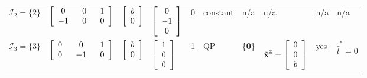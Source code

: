 \documentclass{imaman}
\newcommand{\bfx}{{\bf x}}
\newcommand{\bfzero}{{\bf 0}}
\newcommand{\calI}{{\mathcal I}}
\numberwithin{equation}{section}
\begin{document}
\begin{landscape}
\begin{table}[htbp]
\begin{threeparttable}[htbp]
\begin{tabular}{l l l l l l l l l l}
$\calI_2=\{2\}$ & \hspace{-0.1cm}$\left[ \renewcommand{\arraystretch}{1} \begin{array}{ccc} 0 & ~~0~~ & 1 \\ -1 & ~~0~~ & 0 \end{array}\right]$ & \hspace{-0.3cm}$\left[ \renewcommand{\arraystretch}{1} \begin{array}{c} b\\ 0\end{array}\right]$ & \hspace{-0.2cm}$\left[ \renewcommand{\arraystretch}{1} \begin{array}{c} 0 \\ {-1} \\ 0 \end{array}\right]$ & \hspace{-0.2cm}0 & \hspace{-0.1cm}constant\tnote{a} & \hspace{-0.1cm}n/a & \hspace{-0.1cm}n/a & \hspace{-0.1cm}n/a\tnote{b} & \hspace{-0.1cm}n/a \vspace{0.1cm} \vspace{0.1cm} \\
$\calI_3=\{3\}$ & \hspace{-0.1cm}$\left[ \renewcommand{\arraystretch}{1} \begin{array}{ccc} 0 & ~~0~~ & 1 \\ 0 & ~~{-1}~~ & 0 \end{array}\right]$ & \hspace{-0.3cm}$\left[ \renewcommand{\arraystretch}{1} \begin{array}{c} b\\ 0\end{array}\right]$ & \hspace{-0.2cm}$\left[ \renewcommand{\arraystretch}{1} \begin{array}{c} 1 \\ 0 \\ 0 \end{array}\right]$ & \hspace{-0.2cm}1 & \hspace{-0.1cm}QP & \hspace{-0.1cm}\{\bfzero\} & \hspace{-0.1cm}$\tilde\bfx^{\bar *}=\left[ \renewcommand{\arraystretch}{1} \begin{array}{c} 0 \\ 0 \\ b\end{array}\right]$ & \hspace{-0.1cm}yes & \hspace{-0.1cm}$\tilde{\bar l}^*=0$ \vspace{0.1cm} \vspace{0.1cm} \\

\end{tabular}
\end{threeparttable}
\end{table}
\end{landscape}
\end{document}
